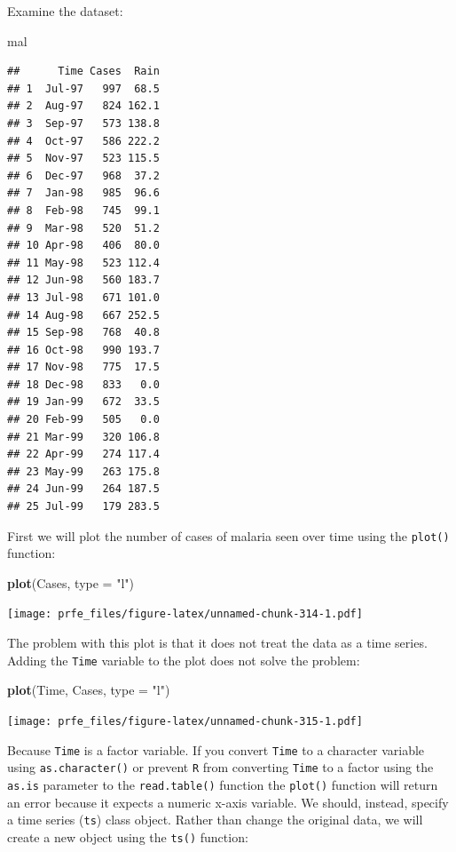 \documentclass[12pt,]{book}
\newenvironment{Shaded}{\begin{snugshade}}{\end{snugshade}}
\newcommand{\KeywordTok}[1]{\textcolor[rgb]{0.13,0.29,0.53}{\textbf{#1}}}
\newcommand{\DataTypeTok}[1]{\textcolor[rgb]{0.13,0.29,0.53}{#1}}
\newcommand{\StringTok}[1]{\textcolor[rgb]{0.31,0.60,0.02}{#1}}
\newcommand{\NormalTok}[1]{#1}
\theoremstyle{definition}
\theoremstyle{definition}
\theoremstyle{definition}
\theoremstyle{remark}
\begin{document}
Examine the dataset:

\begin{Shaded}
\begin{Highlighting}[]
\NormalTok{mal}
\end{Highlighting}
\end{Shaded}

\begin{verbatim}
##      Time Cases  Rain
## 1  Jul-97   997  68.5
## 2  Aug-97   824 162.1
## 3  Sep-97   573 138.8
## 4  Oct-97   586 222.2
## 5  Nov-97   523 115.5
## 6  Dec-97   968  37.2
## 7  Jan-98   985  96.6
## 8  Feb-98   745  99.1
## 9  Mar-98   520  51.2
## 10 Apr-98   406  80.0
## 11 May-98   523 112.4
## 12 Jun-98   560 183.7
## 13 Jul-98   671 101.0
## 14 Aug-98   667 252.5
## 15 Sep-98   768  40.8
## 16 Oct-98   990 193.7
## 17 Nov-98   775  17.5
## 18 Dec-98   833   0.0
## 19 Jan-99   672  33.5
## 20 Feb-99   505   0.0
## 21 Mar-99   320 106.8
## 22 Apr-99   274 117.4
## 23 May-99   263 175.8
## 24 Jun-99   264 187.5
## 25 Jul-99   179 283.5
\end{verbatim}

First we will plot the number of cases of malaria seen over time using
the \texttt{plot()} function:

\begin{Shaded}
\begin{Highlighting}[]
\KeywordTok{plot}\NormalTok{(Cases, }\DataTypeTok{type =} \StringTok{"l"}\NormalTok{)}
\end{Highlighting}
\end{Shaded}

\texttt{[image: prfe\_files/figure-latex/unnamed-chunk-314-1.pdf]}

The problem with this plot is that it does not treat the data as a time
series. Adding the \texttt{Time} variable to the plot does not solve the
problem:

\begin{Shaded}
\begin{Highlighting}[]
\KeywordTok{plot}\NormalTok{(Time, Cases, }\DataTypeTok{type =} \StringTok{"l"}\NormalTok{)}
\end{Highlighting}
\end{Shaded}

\texttt{[image: prfe\_files/figure-latex/unnamed-chunk-315-1.pdf]}

Because \texttt{Time} is a factor variable. If you convert \texttt{Time}
to a character variable using \texttt{as.character()} or prevent
\texttt{R} from converting \texttt{Time} to a factor using the
\texttt{as.is} parameter to the \texttt{read.table()} function the
\texttt{plot()} function will return an error because it expects a
numeric x-axis variable. We should, instead, specify a time series
(\texttt{ts}) class object. Rather than change the original data, we
will create a new object using the \texttt{ts()} function:
\end{document}
